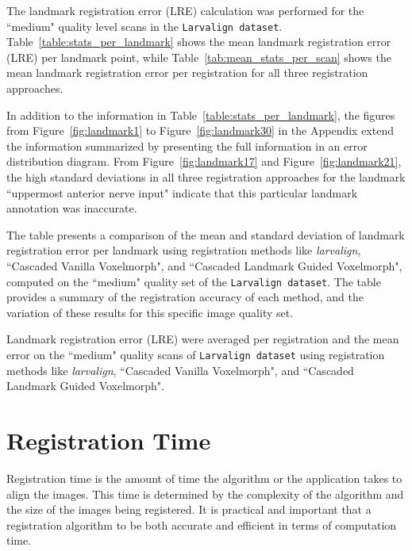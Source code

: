 \documentclass{book}
\begin{document}
	The landmark registration error (LRE) calculation was performed for the ``medium" quality level scans in the \texttt{\texttt{Larvalign dataset}}. Table~\ref{table:stats_per_landmark} shows the mean landmark registration error (LRE) per landmark point, while Table~\ref{tab:mean_stats_per_scan} shows the mean landmark registration error per registration for all three registration approaches.
	
	In addition to the information in Table~\ref{table:stats_per_landmark}, the figures from Figure~\ref{fig:landmark1} to Figure~\ref{fig:landmark30} in the Appendix extend the information summarized by presenting the full information in an error distribution diagram. From Figure~\ref{fig:landmark17} and Figure~\ref{fig:landmark21}, the high standard deviations in all three registration approaches for the landmark ``uppermost anterior nerve input" indicate that this particular landmark annotation was inaccurate.
	
	\begin{table}[h]
		\centering
		
		\caption{The table presents a comparison of the mean and standard deviation of landmark registration error per landmark using registration methods like \textit{larvalign}, ``Cascaded Vanilla Voxelmorph", and ``Cascaded Landmark Guided Voxelmorph", computed on the ``medium" quality set of the \texttt{Larvalign dataset}. The table provides a summary of the registration accuracy of each method, and the variation of these results for this specific image quality set.}
		\label{table:stats_per_landmark}
	\end{table}	

	\begin{table}[h!]
		\centering
		
		\caption{Landmark registration error (LRE) were averaged per registration and the mean error on the ``medium" quality scans of \texttt{Larvalign dataset} using registration methods like \textit{larvalign}, ``Cascaded Vanilla Voxelmorph", and ``Cascaded Landmark Guided Voxelmorph".}
		\label{tab:mean_stats_per_scan}
	\end{table}

	\section{Registration Time} \label{sec:RegTime}
	Registration time is the amount of time the algorithm or the application takes to align the images. This time is determined by the complexity of the algorithm and the size of the images being registered. It is practical and important that a registration algorithm to be both accurate and efficient in terms of computation time.
	
\end{document}
